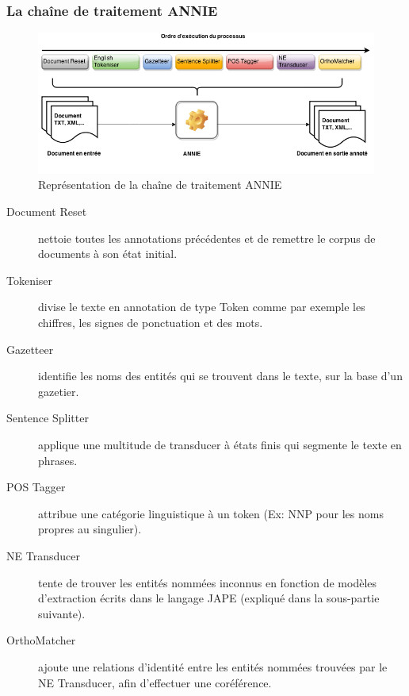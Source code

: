 \documentclass[a4paper, 11pt]{report}
\begin{document}
\subsubsection{La chaîne de traitement ANNIE}
\begin{figure}[H]
\begin{center}
\includegraphics[scale=0.5]{img/annieChaine.png} 
\end{center}
\caption{Représentation de la chaîne de traitement ANNIE}
\end{figure}
\begin{description}
\item[Document Reset] nettoie toutes les annotations précédentes et de remettre le
corpus de documents à son état initial.
\item[Tokeniser] divise le texte en annotation de type Token comme par exemple les chiffres, les
signes de ponctuation et des mots.
\item[Gazetteer] identifie les noms des entités qui se trouvent dans le texte, sur la base d’un gazetier.
\item[Sentence Splitter] applique une multitude de transducer à états finis qui segmente le texte en
phrases.
\item[POS Tagger] attribue une catégorie linguistique à un token (Ex: NNP pour les noms propres au singulier).
\item[NE Transducer] tente de trouver les entités nommées inconnus en fonction de modèles d'extraction écrits dans le langage JAPE (expliqué dans la sous-partie suivante).
\item[OrthoMatcher] ajoute une relations d'identité entre les entités nommées trouvées par le NE Transducer, afin d'effectuer une coréférence.
\end{description}
\end{document}
